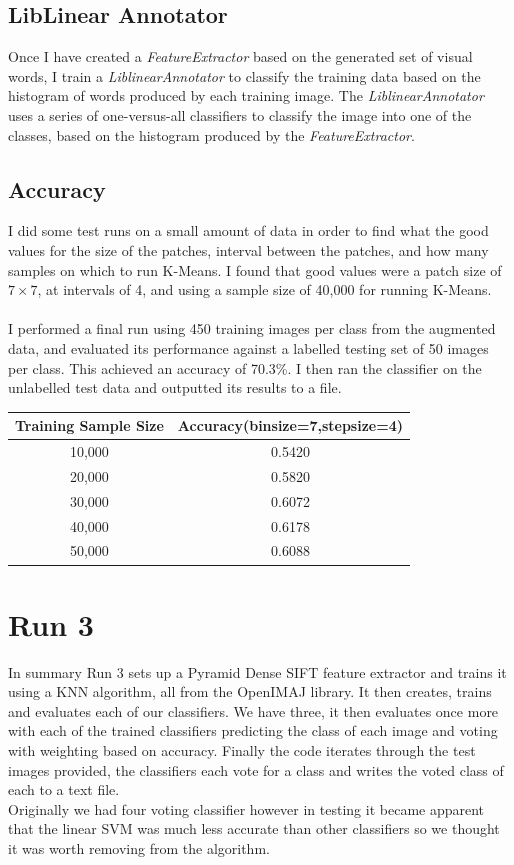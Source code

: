 \documentclass{article}
\begin{document}
	\subsection{ LibLinear Annotator }
	
	Once I have created a \textit{FeatureExtractor} based on the generated set of visual words, I train a \textit{LiblinearAnnotator} to classify the training data based on the histogram of words produced by each training image. The \textit{LiblinearAnnotator} uses a series of one-versus-all classifiers to classify the image into one of the classes, based on the histogram produced by the \textit{FeatureExtractor}.
	
	\subsection{ Accuracy }
	
	I did some test runs on a small amount of data in order to find what the good values for the size of the patches, interval between the patches, and how many samples on which to run K-Means. I found that good values were a patch size of $7\times7$, at intervals of 4, and using  a sample size of 40,000 for running K-Means. \\
	\\
	I performed a final run using 450 training images per class from the augmented data, and evaluated its performance against a labelled testing set of 50 images per class. This achieved an accuracy of 70.3\%. I then ran the classifier on the unlabelled test data and outputted its results to a file.\\
	\begin{tabular}{|c|c|}
		\hline
		Training Sample Size & Accuracy(binsize=7,stepsize=4)\\ \hline \hline
		10,000 & 0.5420 \\
		20,000 & 0.5820 \\
		30,000 & 0.6072 \\
		40,000 & 0.6178 \\
		50,000 & 0.6088 \\ \hline
	\end{tabular}
	
	\section{Run 3}
	In summary Run 3 sets up a Pyramid Dense SIFT feature extractor and trains it using a KNN algorithm, all from the OpenIMAJ library. It then creates, trains and evaluates each of our classifiers. We have three, it then evaluates once more with each of the trained classifiers predicting the class of each image and voting with weighting based on accuracy. Finally the code iterates through the test images provided, the classifiers each vote for a class and writes the voted class of each to a text file.\\
	Originally we had four voting classifier however in testing it became apparent that the linear SVM was much less accurate than other classifiers so we thought it was worth removing from the algorithm.
	
\end{document}
